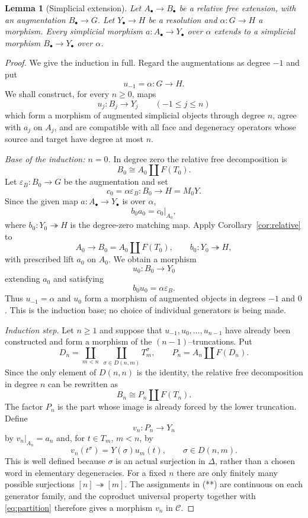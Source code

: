 \documentclass[10pt,a4paper]{amsart}
\newtheorem{lemma}[theorem]{Lemma}
\newcommand{\C}{\mathcal C}
\begin{document}
\begin{lemma}[Simplicial extension]\label{lem:extension}
Let $A_\bullet\to B_\bullet$ be a relative free extension, with an
augmentation $B_\bullet\to G$. Let $Y_\bullet\to H$ be a resolution
and $\alpha:G\to H$ a morphism. Every simplicial morphism
$a:A_\bullet\to Y_\bullet$ over $\alpha$ extends to a simplicial
morphism $B_\bullet\to Y_\bullet$ over $\alpha$.
\end{lemma}
\begin{proof}
We give the induction in full.  Regard the augmentations as degree
$-1$ and put
\[
 u_{-1}=\alpha:G\longrightarrow H.
\]
We shall construct, for every $n\geq0$, maps
\[
 u_j:B_j\longrightarrow Y_j\qquad(-1\leq j\leq n)
\]
which form a morphism of augmented simplicial objects through degree
$n$, agree with $a_j$ on $A_j$, and are compatible with all face and
degeneracy operators whose source and target have degree at most $n$.

\emph{Base of the induction: $n=0$.}
In degree zero the relative free decomposition is
\[
 B_0\cong A_0\amalg F(T_0).
\]
Let $\varepsilon_B:B_0\to G$ be the augmentation and set
\[
 c_0=\alpha\varepsilon_B:B_0\longrightarrow H=M_0Y.
\]
Since the given map $a:A_\bullet\to Y_\bullet$ is over $\alpha$,
\[
 b_0a_0=c_0|_{A_0},
\]
where $b_0:Y_0\twoheadrightarrow H$ is the degree-zero matching map.
Apply Corollary~\ref{cor:relative} to
\[
 A_0\longrightarrow B_0=A_0\amalg F(T_0),
 \qquad b_0:Y_0\twoheadrightarrow H,
\]
with prescribed lift $a_0$ on $A_0$.  We obtain a morphism
\[
 u_0:B_0\longrightarrow Y_0
\]
extending $a_0$ and satisfying
\[
 b_0u_0=\alpha\varepsilon_B.
\]
Thus $u_{-1}=\alpha$ and $u_0$ form a morphism of augmented objects in
degrees $-1$ and $0$.  This is the induction base; no choice of
individual generators is being made.

\emph{Induction step.}
Let $n\geq1$ and suppose that
$u_{-1},u_0,\ldots,u_{n-1}$ have already been constructed and form a
morphism of the $(n-1)$--truncations.  Put
\[
 D_n=
 \coprod_{m<n}\ \coprod_{\sigma\in D(n,m)}T_m^\sigma,
 \qquad
 P_n=A_n\amalg F(D_n).
\]
Since the only element of $D(n,n)$ is the identity, the relative free
decomposition in degree $n$ can be rewritten as
\[
 B_n\cong P_n\amalg F(T_n).                 \tag{*}
\]
The factor $P_n$ is the part whose image is already forced by the lower
truncation.  Define
\[
 v_n:P_n\longrightarrow Y_n
\]
by $v_n|_{A_n}=a_n$ and, for $t\in T_m$, $m<n$, by
\[
 v_n(t^\sigma)=Y(\sigma)u_m(t),
 \qquad \sigma\in D(n,m).                  \tag{**}
\]
This is well defined because $\sigma$ is an actual surjection in
$\Delta$, rather than a chosen word in elementary degeneracies.  For a
fixed $n$ there are only finitely many possible surjections
$[n]\twoheadrightarrow[m]$.  The assignments in (**) are continuous on
each generator family, and the coproduct universal property together
with \eqref{eq:partition} therefore gives a morphism $v_n$ in $\C$.


\end{proof}
\end{document}
